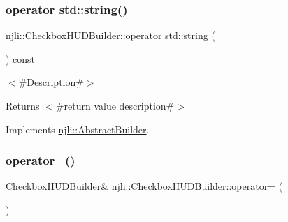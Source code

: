 \subsubsection{\texorpdfstring{operator std\+::string()}{operator std::string()}}
{\footnotesize\ttfamily njli\+::\+Checkbox\+H\+U\+D\+Builder\+::operator std\+::string (\begin{DoxyParamCaption}{ }\end{DoxyParamCaption}) const\hspace{0.3cm}{\ttfamily [virtual]}}

$<$\#\+Description\#$>$

\begin{DoxyReturn}{Returns}
$<$\#return value description\#$>$ 
\end{DoxyReturn}


Implements \mbox{\hyperlink{classnjli_1_1_abstract_builder_a3e6e553e06d1ca30517ad5fb0bd4d000}{njli\+::\+Abstract\+Builder}}.

\mbox{\label{classnjli_1_1_checkbox_h_u_d_builder_a5d42bd65c37400db0b2bb8160ba221f1}} 
\subsubsection{\texorpdfstring{operator=()}{operator=()}}
{\footnotesize\ttfamily \mbox{\hyperlink{classnjli_1_1_checkbox_h_u_d_builder}{Checkbox\+H\+U\+D\+Builder}}\& njli\+::\+Checkbox\+H\+U\+D\+Builder\+::operator= (\begin{DoxyParamCaption}\item[{const \mbox{\hyperlink{classnjli_1_1_checkbox_h_u_d_builder}{Checkbox\+H\+U\+D\+Builder}} \&}]{ }\end{DoxyParamCaption})\hspace{0.3cm}{\ttfamily [protected]}}

\mbox{\label{classnjli_1_1_checkbox_h_u_d_builder_a75491cdbd9744fa247a2c5b179e66195}} 
